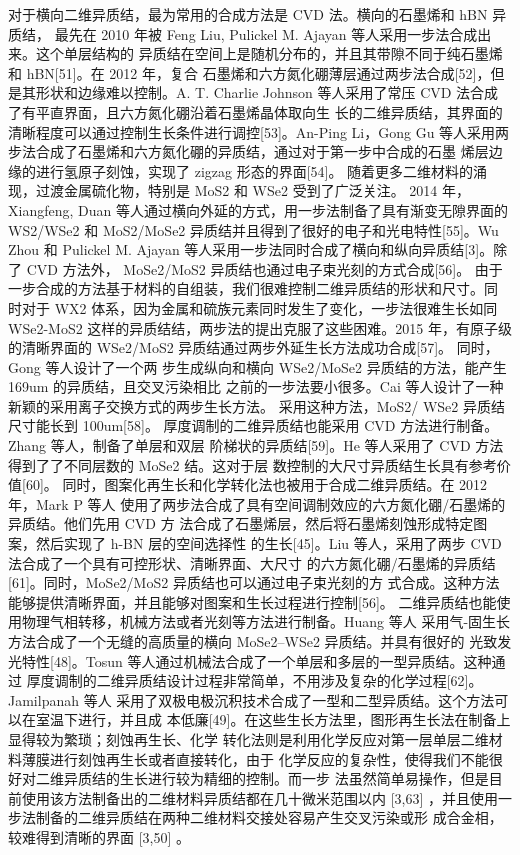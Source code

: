 对于横向二维异质结，最为常用的合成方法是 CVD 法。横向的石墨烯和 hBN 异质结，
最先在 2010 年被 Feng Liu, Pulickel M. Ajayan 等人采用一步法合成出来。这个单层结构的
异质结在空间上是随机分布的，并且其带隙不同于纯石墨烯和 hBN[51]。在 2012 年，复合
石墨烯和六方氮化硼薄层通过两步法合成[52]，但是其形状和边缘难以控制。A. T. Charlie 
Johnson 等人采用了常压 CVD 法合成了有平直界面，且六方氮化硼沿着石墨烯晶体取向生
长的二维异质结，其界面的清晰程度可以通过控制生长条件进行调控[53]。An-Ping Li，Gong 
Gu 等人采用两步法合成了石墨烯和六方氮化硼的异质结，通过对于第一步中合成的石墨
烯层边缘的进行氢原子刻蚀，实现了 zigzag 形态的界面[54]。
随着更多二维材料的涌现，过渡金属硫化物，特别是 MoS2 和 WSe2 受到了广泛关注。
2014 年，Xiangfeng, Duan 等人通过横向外延的方式，用一步法制备了具有渐变无隙界面的
WS2/WSe2 和 MoS2/MoSe2 异质结并且得到了很好的电子和光电特性[55]。Wu Zhou 和
Pulickel M. Ajayan 等人采用一步法同时合成了横向和纵向异质结[3]。除了 CVD 方法外，
MoSe2/MoS2 异质结也通过电子束光刻的方式合成[56]。
由于一步合成的方法基于材料的自组装，我们很难控制二维异质结的形状和尺寸。同
时对于 WX2 体系，因为金属和硫族元素同时发生了变化，一步法很难生长如同 WSe2-MoS2
这样的异质结结，两步法的提出克服了这些困难。2015 年，有原子级的清晰界面的
WSe2/MoS2 异质结通过两步外延生长方法成功合成[57]。 同时，Gong 等人设计了一个两
步生成纵向和横向 WSe2/MoSe2 异质结的方法，能产生 169um 的异质结，且交叉污染相比
之前的一步法要小很多。Cai 等人设计了一种新颖的采用离子交换方式的两步生长方法。
采用这种方法，MoS2/ WSe2 异质结尺寸能长到 100um[58]。
厚度调制的二维异质结也能采用 CVD 方法进行制备。Zhang 等人，制备了单层和双层
阶梯状的异质结[59]。He 等人采用了 CVD 方法得到了了不同层数的 MoSe2 结。这对于层
数控制的大尺寸异质结生长具有参考价值[60]。
同时，图案化再生长和化学转化法也被用于合成二维异质结。在 2012 年，Mark P 等人
使用了两步法合成了具有空间调制效应的六方氮化硼/石墨烯的异质结。他们先用 CVD 方
法合成了石墨烯层，然后将石墨烯刻蚀形成特定图案，然后实现了 h-BN 层的空间选择性
的生长[45]。Liu 等人，采用了两步 CVD 法合成了一个具有可控形状、清晰界面、大尺寸
的六方氮化硼/石墨烯的异质结[61]。同时，MoSe2/MoS2 异质结也可以通过电子束光刻的方
式合成。这种方法能够提供清晰界面，并且能够对图案和生长过程进行控制[56]。
二维异质结也能使用物理气相转移，机械方法或者光刻等方法进行制备。Huang 等人
采用气-固生长方法合成了一个无缝的高质量的横向 MoSe2–WSe2 异质结。并具有很好的
光致发光特性[48]。Tosun 等人通过机械法合成了一个单层和多层的一型异质结。这种通过
厚度调制的二维异质结设计过程非常简单，不用涉及复杂的化学过程[62]。Jamilpanah 等人
采用了双极电极沉积技术合成了一型和二型异质结。这个方法可以在室温下进行，并且成
本低廉[49]。在这些生长方法里，图形再生长法在制备上显得较为繁琐；刻蚀再生长、化学
转化法则是利用化学反应对第一层单层二维材料薄膜进行刻蚀再生长或者直接转化，由于
化学反应的复杂性，使得我们不能很好对二维异质结的生长进行较为精细的控制。而一步
法虽然简单易操作，但是目前使用该方法制备出的二维材料异质结都在几十微米范围以内
[3,63] ，并且使用一步法制备的二维异质结在两种二维材料交接处容易产生交叉污染或形
成合金相，较难得到清晰的界面 [3,50] 。


